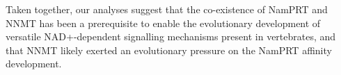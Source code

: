 Taken together, our analyses suggest that the co-existence of NamPRT and NNMT has been a prerequisite to enable the evolutionary development of versatile NAD+-dependent signalling mechanisms present in vertebrates, and that NNMT likely exerted an evolutionary pressure on the NamPRT affinity development.
